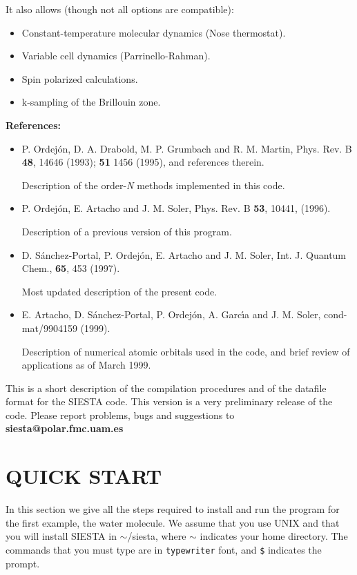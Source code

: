 It also allows (though not all options are compatible):
\begin{itemize}
\item Constant-temperature molecular dynamics (Nose thermostat).
\item Variable cell dynamics (Parrinello-Rahman).
\item Spin polarized calculations.
\item k-sampling of the Brillouin zone.
\end{itemize}

{\large {\bf References:} }

\begin{itemize}

\item
P. Ordej\'on, D. A. Drabold, M. P. Grumbach and R. M. Martin, 
Phys. Rev. B {\bf 48}, 14646 (1993); {\bf 51} 1456 (1995),
and references therein.

Description of the order-{\it N}
methods implemented in this code.

\item
P. Ordej\'on, E. Artacho and J. M. Soler,
Phys. Rev. B {\bf 53}, 10441, (1996).

Description of a previous version of this program.

\item
D. S\'anchez-Portal, P. Ordej\'on, E. Artacho and J. M. Soler,
Int. J. Quantum Chem., {\bf 65}, 453 (1997).

Most updated description of the present code.

\item
E. Artacho, D. S\'anchez-Portal, P. Ordej\'on, A. Garc\'{\i}a and
J. M. Soler, cond-mat/9904159 (1999).

Description of numerical atomic orbitals used in the code,
and brief review of applications as of March 1999.

\end{itemize}

This is a short description of the compilation procedures
and of the datafile format for the SIESTA code.
This version is a very preliminary release of the code.
Please report problems, bugs and suggestions to
{\bf siesta@polar.fmc.uam.es}



\section{QUICK START}

\noindent
In this section we give all the steps required to install
and run the program for the first example, the water molecule.
We assume that you use UNIX and that you will install SIESTA in 
$\sim$/siesta, where $\sim$ indicates your home directory.
The commands that you must type are in {\tt typewriter} font, 
and {\tt \$} indicates the prompt.

